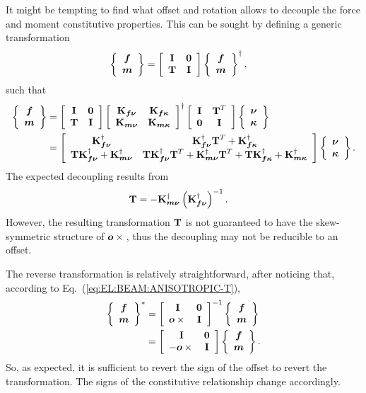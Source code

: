 It might be tempting to find what offset and rotation allows
to decouple the force and moment constitutive properties.
This can be sought by defining a generic transformation
\begin{align}
	\cubr{\cvvect{
		\T{f} \\
		\T{m}
	}}
	&= \sqbr{\matr{cc}{
		\TT{I} & \TT{0} \\
		\TT{T} & \TT{I}
	}}
	\cubr{\cvvect{
		\T{f} \\
		\T{m}
	}}^\dagger
	,
\end{align}
such that
\begin{align}
	\cubr{\cvvect{
		\T{f} \\
		\T{m}
	}}
	&=
	\sqbr{\matr{cc}{
		\TT{I} & \TT{0} \\
		\TT{T} & \TT{I}
	}}
	\sqbr{\matr{cc}{
		\TT{K}_{\T{f}\T{\nu}} & \TT{K}_{\T{f}\T{\kappa}} \\
		\TT{K}_{\T{m}\T{\nu}} & \TT{K}_{\T{m}\T{\kappa}}
	}}^\dagger
	\sqbr{\matr{cc}{
		\TT{I} & \TT{T}^T \\
		\TT{0} & \TT{I}
	}}
	\cubr{\cvvect{
		\T{\nu} \\
		\T{\kappa}
	}}
	\nonumber \\
	&=
	\sqbr{\matr{cc}{
		\TT{K}_{\T{f}\T{\nu}}^\dagger
		& \TT{K}_{\T{f}\T{\nu}}^\dagger \TT{T}^T
			+ \TT{K}_{\T{f}\T{\kappa}}^\dagger \\
		\TT{T}\TT{K}_{\T{f}\T{\nu}}^\dagger
			+ \TT{K}_{\T{m}\T{\nu}}^\dagger
		& \TT{T}\TT{K}_{\T{f}\T{\nu}}^\dagger \TT{T}^T
			+ \TT{K}_{\T{m}\T{\nu}}^\dagger \TT{T}^T
			+ \TT{T}\TT{K}_{\T{f}\T{\kappa}}^\dagger
			+ \TT{K}_{\T{m}\T{\kappa}}^\dagger
	}}
	\cubr{\cvvect{
		\T{\nu} \\
		\T{\kappa}
	}}
	.
\end{align}
The expected decoupling results from
\begin{align}
	\TT{T}
	&= 
	- \TT{K}_{\T{m}\T{\nu}}^\dagger
		\plbr{\TT{K}_{\T{f}\T{\nu}}^\dagger}^{-1}
	.
\end{align}
However, the resulting transformation $\TT{T}$ is not guaranteed
to have the skew-symmetric structure of $\T{o}\times{}$,
thus the decoupling may not be reducible to an offset.

The reverse transformation is relatively straightforward, after noticing
that, according to Eq.~(\ref{eq:EL:BEAM:ANISOTROPIC-T}), 
\begin{align}
	\cubr{\cvvect{
		\T{f} \\
		\T{m}
	}}^*
	&= \sqbr{\matr{cc}{
		\TT{I} & \TT{0} \\
		\T{o}\times{} & \TT{I}
	}}^{-1}
	\cubr{\cvvect{
		\T{f} \\
		\T{m}
	}}
	\nonumber \\
	&= \sqbr{\matr{cc}{
		\TT{I} & \TT{0} \\
		-\T{o}\times{} & \TT{I}
	}}
	\cubr{\cvvect{
		\T{f} \\
		\T{m}
	}}
	.
\end{align}
So, as expected, it is sufficient to revert the sign of the offset
to revert the transformation.
The signs of the constitutive relationship change accordingly.


